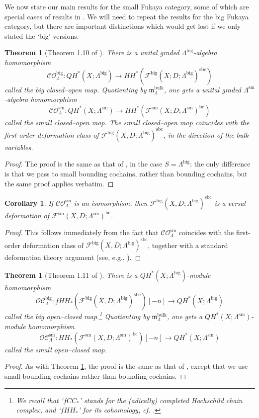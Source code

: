 \documentclass{article}
\newtheorem{thm}[lem]{Theorem}
\newtheorem{cor}[lem]{Corollary}
\def\fuk{\EuF}
\def\bc{\mathsf{bc}}
\newcommand{\fm}{\mathfrak{m}}
\def\cO{\mathcal{O}}
\def\cC{\mathcal{C}}
\def\fuk{\mathcal{F}}
\def\bc{{\operatorname{bc}}}
\def\big{{\operatorname{big}}}
\def\sm{{\operatorname{sm}}}
\def\sbc{{\operatorname{sbc}}}
\def\bulk{{\operatorname{bulk}}}
\begin{document}
We now state our main results for the small Fukaya category, some of which are special cases of results in \cite{relfukii}. 
We will need to repeat the results for the big Fukaya category, but there are important distinctions which would get lost if we only stated the `big' versions.

\begin{thm}[Theorem 1.10 of \cite{relfukii}]\label{thm:co_int}
There is a unital graded $\Lambda^\big$-algebra homomorphism
$$\cC\cO_\Lambda^\big: QH^*(X;\Lambda^\big) \to HH^*(\fuk^\big(X;D;\Lambda^\big)^\sbc)$$
called the \emph{big closed--open map}. 
Quotienting by $\fm^\bulk_\Lambda$, one gets a unital graded $\Lambda^\sm$-algebra homomorphism
$$\cC\cO_\Lambda^\sm: QH^*(X;\Lambda^\sm) \to HH^*(\fuk^\sm(X;D;\Lambda^\sm)^\bc)$$
called the \emph{small closed--open map}. 
The small closed--open map coincides with the first-order deformation class of $\fuk^\big(X,D;\Lambda^\big)^\sbc$, in the direction of the bulk variables.
\end{thm}
\begin{proof}
    The proof is the same as that of \cite[Theorem 1.10]{relfukii}, in the case $S = \Lambda^\big$: the only difference is that we pass to small bounding cochains, rather than bounding cochains, but the same proof applies verbatim.
\end{proof}

\begin{cor}\label{cor:vers}
    If $\cC\cO_\Lambda^\sm$ is an isomorphism, then $\fuk^\big(X,D;\Lambda^\big)^\sbc$ is a versal deformation of $\fuk^\sm(X,D;\Lambda^\sm)^\bc$. 
\end{cor}
\begin{proof}
    This follows immediately from the fact that $\cC\cO_\Lambda^\sm$ coincides with the first-order deformation class of $\fuk^\big(X,D;\Lambda^\big)^\sbc$, together with a standard deformation theory argument (see, e.g., \cite[Theorem 3.3]{Sheridan_CDM}). 
\end{proof}

\begin{thm}[Theorem 1.11 of \cite{relfukii}] \label{thm:oc_int}
There is a $QH^*(X;\Lambda^\big)$-module homomorphism
$$\cO\cC_\Lambda^\big: fHH_*(\fuk^\big(X,D;\Lambda^\big)^\sbc)[-n] \to QH^*(X;\Lambda^\big)
$$
called the \emph{big open--closed map}.\footnote{We recall that `$fCC_*$' stands for the (adically) completed Hochschild chain complex, and `$fHH_*$' for its cohomology, cf. \cite[Section 2.8]{relfukii}.}
Quotienting by $\fm^\bulk_\Lambda$, one gets a $QH^*(X;\Lambda^\sm)$-module homomorphism
$$\cO\cC_\Lambda^\sm: HH_*(\fuk^\sm(X,D;\Lambda^\sm)^\bc)[-n] \to QH^*(X;\Lambda^\sm)
$$
called the \emph{small open--closed map}.
\end{thm}
\begin{proof}
     As with Theorem \ref{thm:co_int}, the proof is the same as that of \cite[Theorem 1.11]{relfukii}, except that we use small bounding cochains rather than bounding cochains.
\end{proof}
\end{document}
